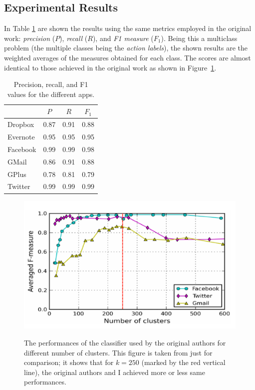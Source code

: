 \subsection{Experimental Results}
In Table \ref{tab:results} are shown the results using the same metrics employed in the original work: \textit{precision} ($P$), \textit{recall} ($R$), and \textit{F1 measure} ($F_1$). Being this a multiclass problem (the multiple classes being the \textit{action labels}), the shown results are the weighted averages of the measures obtained for each class. The scores are almost identical to those achieved in the original work as shown in Figure~\ref{fig:original}. 

\begin{table}[h]
\centering
\begin{tabular}{l|ccc}
\hline
         & $P$ & $R$ & $F_1$ \\ \hline
Dropbox  & 0.87    &  0.91   &    0.88   \\
Evernote & 0.95   &  0.95   &    0.95   \\
Facebook &  0.99   &  0.99   &  0.98     \\
GMail    &   0.86  &   0.91  &   0.88    \\
GPlus    &  0.78   &  0.81   &   0.79    \\
Twitter  &  0.99   &  0.99   &   0.99    \\ \hline
\end{tabular}
\caption{Precision, recall, and F1 values for the different apps. }
\label{tab:results}
\end{table}

\begin{figure}[h]
\centering
\includegraphics[scale=0.5]{images/fig10}
  \label{fig:sfig1}
\caption{The performances of the classifier used by the original authors for different number of clusters. This figure is taken from \cite{contiknocking} just for comparison; it shows that for $k=250$ (marked by the red vertical line), the original authors and I achieved more or less same performances.}
\label{fig:original}
\end{figure}

